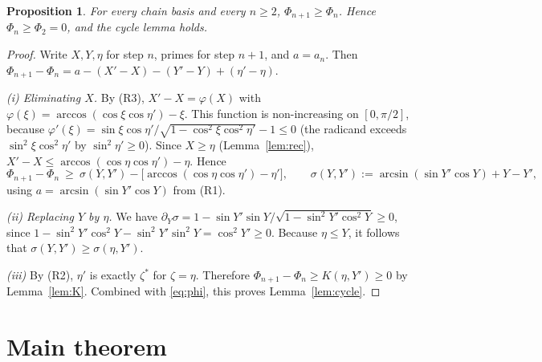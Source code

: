 \documentclass[11pt]{article}
\newtheorem{proposition}[theorem]{Proposition}
\theoremstyle{remark}
\begin{document}
\begin{proposition}\label{prop:mono}
For every chain basis and every $n\ge2$, $\Phi_{n+1}\ge\Phi_n$.
Hence $\Phi_n\ge\Phi_2=0$, and the cycle lemma holds.
\end{proposition}
\begin{proof}
Write $X,Y,\eta$ for step $n$, primes for step $n+1$, and $a=a_n$. Then
$\Phi_{n+1}-\Phi_n=a-(X'-X)-(Y'-Y)+(\eta'-\eta)$.

\emph{(i) Eliminating $X$.} By (R3), $X'-X=\varphi(X)$ with
$\varphi(\xi)=\arccos(\cos\xi\cos\eta')-\xi$. This function is non-increasing
on $[0,\pi/2]$, because
$\varphi'(\xi)=\sin\xi\cos\eta'/\sqrt{1-\cos^2\xi\cos^2\eta'}-1\le0$
(the radicand exceeds $\sin^2\xi\cos^2\eta'$ by $\sin^2\eta'\ge 0$).
Since $X\ge\eta$ (Lemma~\ref{lem:rec}),
$X'-X\le\arccos(\cos\eta\cos\eta')-\eta$. Hence
\[
\Phi_{n+1}-\Phi_n\ \ge\ \sigma(Y,Y')-\bigl[\arccos(\cos\eta\cos\eta')-\eta'\bigr],
\qquad \sigma(Y,Y'):=\arcsin(\sin Y'\cos Y)+Y-Y',
\]
using $a=\arcsin(\sin Y'\cos Y)$ from (R1).

\emph{(ii) Replacing $Y$ by $\eta$.} We have
$\partial_Y\sigma=1-\sin Y'\sin Y/\sqrt{1-\sin^2Y'\cos^2Y}\ge0$, since
$1-\sin^2Y'\cos^2Y-\sin^2Y'\sin^2Y=\cos^2Y'\ge0$. Because
$\eta\le Y$, it follows that $\sigma(Y,Y')\ge\sigma(\eta,Y')$.

\emph{(iii)} By (R2), $\eta'$ is exactly $\zeta^*$ for $\zeta=\eta$.
Therefore $\Phi_{n+1}-\Phi_n\ge K(\eta,Y')\ge0$ by Lemma~\ref{lem:K}.
Combined with \eqref{eq:phi}, this proves Lemma~\ref{lem:cycle}.
\end{proof}

\section{Main theorem}
\end{document}

